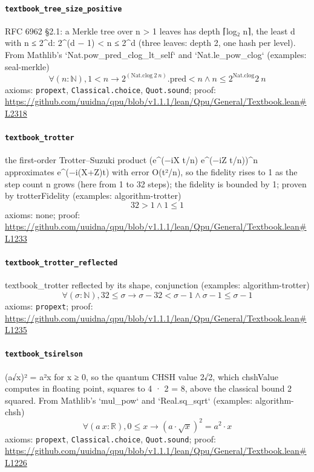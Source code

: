 \documentclass[11pt]{article}
\begin{document}
\paragraph{\texttt{textbook\_tree\_size\_positive}}
RFC 6962 §2.1: a Merkle tree over n > 1 leaves has depth ⌈log₂ n⌉, the least d with n ≤ 2\^{}d: 2\^{}(d − 1) < n ≤ 2\^{}d (three leaves: depth 2, one hash per level). From Mathlib's `Nat.pow\_pred\_clog\_lt\_self` and `Nat.le\_pow\_clog` (examples: seal-merkle)
\[ \forall (n : \mathbb{N}), 1 < n \to 2 ^{(\mathrm{Nat.clog}\ 2\ n)}\mathrm{.pred} < n \land n \le 2 ^{\mathrm{Nat.clog}} 2\ n \]
\noindent axioms: \texttt{propext}, \texttt{Classical.choice}, \texttt{Quot.sound}; proof: \url{https://github.com/uuidna/qpu/blob/v1.1.1/lean/Qpu/General/Textbook.lean\#L2318}

\paragraph{\texttt{textbook\_trotter}}
the first-order Trotter–Suzuki product (e\^{}(−iX t/n) e\^{}(−iZ t/n))\^{}n approximates e\^{}(−i(X+Z)t) with error O(t²/n), so the fidelity rises to 1 as the step count n grows (here from 1 to 32 steps); the fidelity is bounded by 1; proven by trotterFidelity (examples: algorithm-trotter)
\[ 32 > 1 \land 1 \le 1 \]
\noindent axioms: none; proof: \url{https://github.com/uuidna/qpu/blob/v1.1.1/lean/Qpu/General/Textbook.lean\#L1233}

\paragraph{\texttt{textbook\_trotter\_reflected}}
textbook\_trotter reflected by its shape, conjunction (examples: algorithm-trotter)
\[ \forall (\sigma : \mathbb{N}), 32 \le \sigma \to \sigma - 32 < \sigma - 1 \land \sigma - 1 \le \sigma - 1 \]
\noindent axioms: \texttt{propext}; proof: \url{https://github.com/uuidna/qpu/blob/v1.1.1/lean/Qpu/General/Textbook.lean\#L1235}

\paragraph{\texttt{textbook\_tsirelson}}
(a√x)² = a²x for x ≥ 0, so the quantum CHSH value 2√2, which chshValue computes in floating point, squares to 4 · 2 = 8, above the classical bound 2 squared. From Mathlib's `mul\_pow` and `Real.sq\_sqrt` (examples: algorithm-chsh)
\[ \forall (a\ x : \mathbb{R}), 0 \le x \to (a \cdot \surd x) ^{2} = a ^{2} \cdot x \]
\noindent axioms: \texttt{propext}, \texttt{Classical.choice}, \texttt{Quot.sound}; proof: \url{https://github.com/uuidna/qpu/blob/v1.1.1/lean/Qpu/General/Textbook.lean\#L1226}
\end{document}
